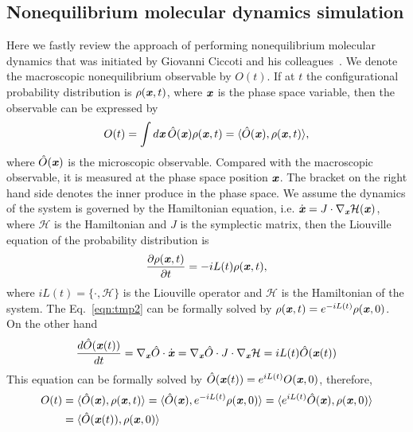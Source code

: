\documentclass[aip,jcp,a4paper,preprint,onecolumn]{revtex4-1}
\newcommand{\vect}[1]{\textbf{\textit{#1}}}
\begin{document}
\subsection{Nonequilibrium molecular dynamics simulation}
Here we fastly review the approach of performing nonequilibrium
molecular dynamics that was initiated by Giovanni Ciccoti and his
colleagues~\cite{ciccotti1975direct, ciccotti1979thought,
  orlandini2011hydrodynamics, orlandini2011hydrodynamics-01}.
We denote the macroscopic nonequilibrium observable by $O(t)$. If at $t$
the configurational probability distribution is $\rho(\vect x, t)$, where
$\vect x$ is the phase space variable, then the observable can be
expressed by
\begin{align}\label{eqn:tmp1}
  O(t) = \int d\vect x\, \hat O(\vect x)\rho(\vect x, t)  = \langle \hat O(\vect x), \rho(\vect x, t)\rangle,
\end{align}
where $\hat O (\vect x)$ is the microscopic observable. Compared with
the macroscopic observable, it is measured at the phase space position $\vect x$.
The bracket on the right hand side denotes the inner produce in the
phase space.  We assume the dynamics of the system is governed by the
Hamiltonian equation, i.e. $\dot {\vect x} = J \cdot \nabla_{\vect x}
\mathcal H(\vect x)$, where $\mathcal H$ is the Hamiltonian and $J$ is
the symplectic matrix, then the Liouville equation of the probability
distribution is
\begin{align}\label{eqn:tmp2}
  \frac{\partial \rho(\vect x, t)}{\partial t} = - iL(t) \rho(\vect x, t),
\end{align}
where $iL(t) = \{\cdot, \mathcal H\}$ is the Liouville operator and
$\mathcal H$ is the Hamiltonian of the system. The Eq.~\eqref{eqn:tmp2}
can be formally solved by $\rho(\vect x, t) = e^{-iL(t)} \rho(\vect x, 0)$.
On the other hand
\begin{align}
  \frac{d \hat O(\vect x(t))}{dt} = \nabla_{\vect x}\hat O\cdot \dot{\vect x}
  = \nabla_{\vect x}\hat O\cdot J\cdot \nabla_{\vect x}\mathcal H
  = iL(t) \hat O (\vect x(t))
\end{align}
This equation can be formally solved by $\hat O(\vect x(t)) = e^{iL(t)} O(\vect x, 0)$, therefore,
\begin{align}\nonumber
  O(t) & = \langle \hat O(\vect x), \rho(\vect x, t)\rangle
  = \langle \hat O(\vect x), e^{-iL(t)} \rho(\vect x, 0)\rangle
  = \langle e^{iL(t)}\hat O(\vect x), \rho(\vect x, 0)\rangle\\\label{eqn:tmp4}
  &= \langle \hat O(\vect x(t)), \rho(\vect x, 0)\rangle
\end{align}
\end{document}
